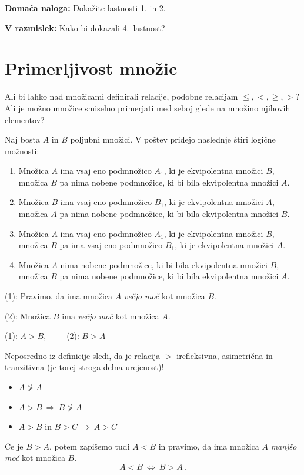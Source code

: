 \documentclass[11pt,paper=b5,footinclude,headinclude]{scrbook} %
\def\sledi {{~\Rightarrow~}}
\def\cee {{~\Leftrightarrow~}}
\begin{document}
\textbf{Domača naloga:} Dokažite lastnosti 1. in 2.

\textbf{V razmislek:} Kako bi dokazali 4.~lastnost?


\section{Primerljivost množic}
Ali bi lahko nad množicami definirali relacije, podobne relacijam
$\le , <, \ge, >$? Ali je možno množice smiselno primerjati med seboj
glede na množino njihovih elementov?

\bigskip
Naj bosta $A$ in $B$ poljubni množici. V poštev pridejo naslednje štiri logične možnosti:
\begin{enumerate}[(1)]
  \item Množica $A$ ima vsaj eno podmnožico $A_1$, ki je ekvipolentna množici $B$, množica $B$
  pa nima nobene podmnožice, ki bi bila ekvipolentna množici $A$.
  \item Množica $B$ ima vsaj eno podmnožico $B_1$, ki je ekvipolentna množici $A$,
  množica $A$  pa nima nobene podmnožice, ki bi bila ekvipolentna množici $B$.
  \item Množica $A$ ima vsaj eno podmnožico $A_1$, ki je ekvipolentna množici $B$,
  množica $B$
  pa ima vsaj eno podmnožico $B_1$, ki je ekvipolentna množici $A$.
  \item Množica $A$ nima nobene podmnožice, ki bi bila ekvipolentna množici $B$,
  množica $B$ pa nima nobene podmnožice, ki bi bila ekvipolentna množici $A$.
\end{enumerate}

(1): Pravimo, da ima množica $A$ {\em večjo moč} kot množica $B$.

(2): Množica $B$ ima {\em večjo moč} kot množica $A$.

(1): $A>B$,~~~~~(2): $B>A$

\bigskip
Neposredno iz definicije sledi, da je relacija $>$
irefleksivna, asimetrična in tranzitivna (je torej stroga delna urejenost)!
\begin{itemize}
  \item $A\ngtr A$
  \item $A>B\sledi B\ngtr A$
  \item $A>B$ in $B>C\sledi A> C$
\end{itemize}

Če je $B>A$, potem zapišemo tudi $A<B$ in pravimo, da ima množica
$A$ {\em manjšo moč} kot množica $B$.
$$A<B\cee B>A\,.$$
\end{document}
